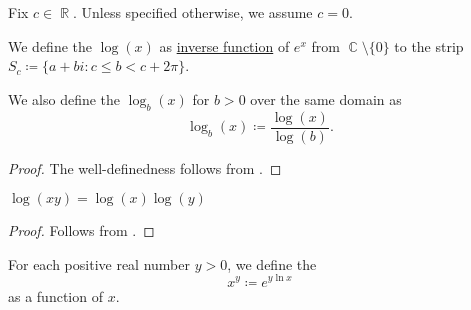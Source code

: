 \begin{definition}\label{def:logarithm}
  Fix \( c \in \BbbR \). Unless specified otherwise, we assume \( c = 0 \).

  We define the  \( \log(x) \) as \hyperref[def:multi_valued_function/inverse]{inverse function} of \( e^x \) from \( \BbbC \setminus \{ 0 \} \) to the strip \( S_c \coloneqq \{ a + bi \colon c \leq b < c + 2\pi \} \).

  We also define the  \( \log_b(x) \) for \( b > 0 \) over the same domain as
  \begin{equation*}
    \log_b(x) \coloneqq \frac {\log(x)} {\log(b)}.
  \end{equation*}
\end{definition}
\begin{proof}
  The well-definedness follows from .
\end{proof}

\begin{proposition}\label{thm:def:logarithm}
  \hfill
  \begin{thmenum}
     \( \log(xy) = \log(x) \log(y) \)
  \end{thmenum}
\end{proposition}
\begin{proof}
   Follows from .
\end{proof}

\begin{definition}\label{def:power_function}
  For each positive real number \( y > 0 \), we define the 
  \begin{equation*}
    x^y \coloneqq e^{y \ln x}
  \end{equation*}
  as a function of \( x \).
\end{definition}

